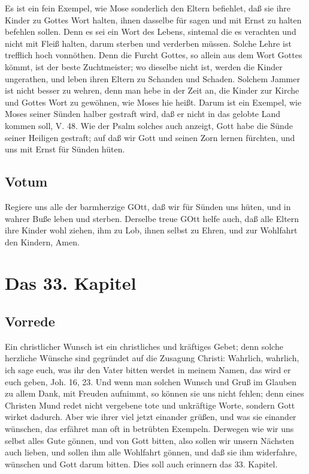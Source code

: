 Es ist ein fein Exempel, wie Mose sonderlich den Eltern befiehlet, daß sie ihre Kinder zu Gottes Wort halten, ihnen dasselbe für sagen und mit Ernst zu halten befehlen sollen. Denn es sei ein Wort des Lebens, sintemal die es verachten und nicht mit Fleiß halten, darum sterben und verderben müssen. Solche Lehre ist trefflich hoch vonnöthen. Denn die Furcht Gottes, so allein aus dem Wort Gottes kömmt, ist der beste Zuchtmeister; wo dieselbe nicht ist, werden die Kinder ungerathen, und leben ihren Eltern zu Schanden und Schaden. Solchem Jammer ist nicht besser zu wehren, denn man hebe in der Zeit an, die Kinder zur Kirche und Gottes Wort zu gewöhnen, wie Moses hie heißt. Darum ist ein Exempel, wie Moses seiner Sünden halber gestraft wird, daß er nicht in das gelobte
Land kommen soll, V. 48. Wie der Psalm solches auch anzeigt, Gott habe die Sünde seiner Heiligen gestraft; auf daß wir Gott und seinen Zorn lernen fürchten, und uns mit Ernst für Sünden hüten.

\section{Votum}

Regiere uns alle der barmherzige GOtt, daß wir für Sünden uns hüten, und in wahrer Buße leben und sterben. Derselbe treue GOtt helfe auch, daß alle Eltern ihre Kinder wohl ziehen, ihm zu Lob, ihnen selbst zu Ehren, und zur Wohlfahrt den Kindern, Amen.

\chapter{Das 33. Kapitel}

\section{Vorrede}

Ein christlicher Wunsch ist ein christliches und kräftiges Gebet; denn solche herzliche Wünsche sind gegründet auf die Zusagung Christi: Wahrlich, wahrlich, ich sage euch, was ihr den Vater bitten werdet in meinem Namen, das wird er euch geben, Joh. 16, 23. Und wenn man solchen Wunsch und Gruß im Glauben zu allem Dank, mit Freuden aufnimmt, so können sie uns nicht fehlen; denn eines Christen Mund redet nicht vergebene tote und unkräftige Worte, sondern Gott wirket dadurch. Aber wie ihrer viel jetzt einander grüßen, und was sie einander wünschen, das erfähret man oft in betrübten Exempeln. Derwegen wie wir uns selbst alles Gute gönnen, und von Gott bitten, also sollen wir unsern Nächsten auch lieben, und sollen ihm alle Wohlfahrt gönnen, und daß sie ihm widerfahre, wünschen und Gott darum bitten. Dies soll auch erinnern das 33. Kapitel.


